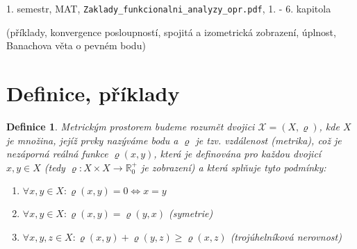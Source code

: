 \documentclass[a4paper, 11pt]{report}
\newtheorem{mydef}{Definice}[chapter]
\begin{document}
1. semestr, MAT, \texttt{Zaklady\_funkcionalni\_analyzy\_opr.pdf}, 1. -  6. kapitola

(příklady, konvergence posloupností, spojitá a izometrická zobrazení, úplnost, Banachova věta o pevném bodu)

\section{Definice, příklady}
\begin{mydef}
Metrickým prostorem budeme rozumět dvojici $\mathcal{X} = (X, \varrho)$, kde $X$ je množina, jejíž prvky nazýváme bodu a $\varrho$ je tzv. vzdálenost (metrika), což je nezáporná reálná funkce $\varrho(x, y)$, která je definována pro každou dvojicí $x, y \in X$ (tedy $\varrho: X \times X \to \mathbb{R}_0^+$ je zobrazení) a která splňuje tyto podmínky:
\begin{enumerate}[1)]
	\item $\forall x, y \in X: \varrho(x, y) = 0 \Leftrightarrow x = y$
	\item $\forall x, y \in X: \varrho(x, y) = \varrho(y, x)$ (symetrie)
	\item $\forall x, y, z \in X: \varrho(x, y) + \varrho(y, z) \geq \varrho(x, z)$ (trojúhelníková nerovnost)
\end{enumerate}
\end{mydef}
\end{document}
